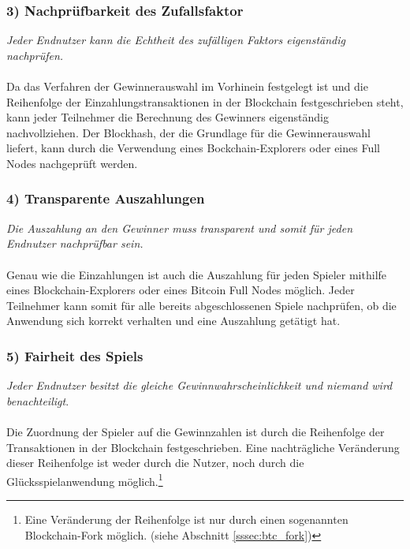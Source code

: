 
\subsubsection{3) Nachprüfbarkeit des Zufallsfaktor}
\textit{Jeder Endnutzer kann die Echtheit des zufälligen Faktors eigenständig nachprüfen.}\\\\
Da das Verfahren der Gewinnerauswahl im Vorhinein festgelegt ist und die Reihenfolge der Einzahlungstransaktionen in der Blockchain festgeschrieben steht, kann jeder Teilnehmer die Berechnung des Gewinners eigenständig nachvollziehen. Der Blockhash, der die Grundlage für die Gewinnerauswahl liefert, kann durch die Verwendung eines Bockchain-Explorers oder eines Full Nodes nachgeprüft werden. 
\subsubsection{4) Transparente Auszahlungen}
\textit{Die Auszahlung an den Gewinner muss transparent und somit für jeden Endnutzer nachprüfbar sein.}\\\\
Genau wie die Einzahlungen ist auch die Auszahlung für jeden Spieler mithilfe eines Blockchain-Explorers oder eines Bitcoin Full Nodes möglich. Jeder Teilnehmer kann somit für alle bereits abgeschlossenen Spiele nachprüfen, ob die Anwendung sich korrekt verhalten und eine Auszahlung getätigt hat. 
\subsubsection{5) Fairheit des Spiels}
\textit{Jeder Endnutzer besitzt die gleiche Gewinnwahrscheinlichkeit und niemand wird benachteiligt}.\\\\
Die Zuordnung der Spieler auf die Gewinnzahlen ist durch die Reihenfolge der Transaktionen in der Blockchain festgeschrieben. Eine nachträgliche Veränderung dieser Reihenfolge ist weder durch die Nutzer, noch durch die Glücksspielanwendung möglich.\footnote{Eine Veränderung der Reihenfolge ist nur durch einen sogenannten Blockchain-Fork möglich. (siehe Abschnitt \ref{sssec:btc_fork})}

